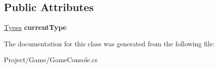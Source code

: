 \subsection*{Public Attributes}
\begin{DoxyCompactItemize}
\item 
\mbox{\label{class_lerp2_a_p_i_1_1_game_1_1_uni_cast_a5b53b8fda4168d5797db9498b52687ef}} 
\hyperlink{class_types}{Types} {\bfseries current\+Type}
\end{DoxyCompactItemize}


The documentation for this class was generated from the following file\+:\begin{DoxyCompactItemize}
\item 
Project/\+Game/Game\+Console.\+cs\end{DoxyCompactItemize}
